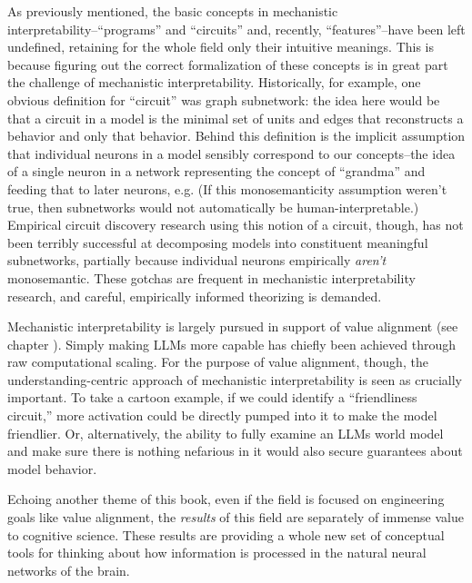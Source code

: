 As previously mentioned, the basic concepts in mechanistic
interpretability--``programs'' and ``circuits'' and, recently,
``features''--have been left undefined, retaining for the whole field only
their intuitive meanings. This is because figuring out the correct
formalization of these concepts is in great part the challenge of mechanistic
interpretability. Historically, for example, one obvious definition for
``circuit'' was graph subnetwork: the idea here would be that a circuit in a
model is the minimal set of units and edges that reconstructs a behavior and
only that behavior. Behind this definition is the implicit assumption that
individual neurons in a model sensibly correspond to our concepts--the idea of
a single neuron in a network representing the concept of ``grandma'' and
feeding that to later neurons, e.g. (If this monosemanticity assumption weren't
true, then subnetworks would not automatically be human-interpretable.)
Empirical circuit discovery research using this notion of a circuit, though,
has not been terribly successful at decomposing models into constituent
meaningful subnetworks, partially because individual neurons empirically
\emph{aren't} monosemantic. These gotchas are frequent in mechanistic
interpretability research, and careful, empirically informed theorizing is
demanded.

Mechanistic interpretability is largely pursued in support of value alignment
(see chapter ). Simply making LLMs more capable has
chiefly been achieved through raw computational scaling. For the purpose of
value alignment, though, the understanding-centric approach of mechanistic
interpretability is seen as crucially important. To take a cartoon example, if
we could identify a ``friendliness circuit,'' more activation could be directly
pumped into it to make the model friendlier. Or, alternatively, the ability to
fully examine an LLMs world model and make sure there is nothing nefarious in
it would also secure guarantees about model behavior.

Echoing another theme of this book, even if the field is focused on engineering
goals like value alignment, the \emph{results} of this field are separately of
immense value to cognitive science. These results are providing a whole new set
of conceptual tools for thinking about how information is processed in the
natural neural networks of the brain.

